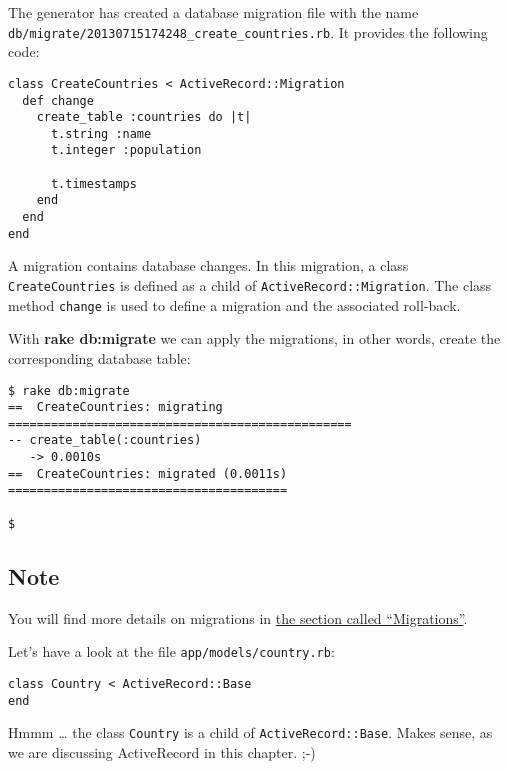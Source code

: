 \documentclass[a4paper]{book}
\newcounter{tab}[chapter]
\begin{document}
The generator has created a database migration file with the name \texttt{db/migrate/20130715174248\_create\_countries.rb}. It provides the following code:

\begin{shaded}\begin{verbatim}
class CreateCountries < ActiveRecord::Migration
  def change
    create_table :countries do |t|
      t.string :name
      t.integer :population

      t.timestamps
    end
  end
end
\end{verbatim}\end{shaded}

A migration contains database changes. In this migration, a class \texttt{CreateCountries} is defined as a child of \texttt{ActiveRecord::Migration}. The class method \texttt{change} is used to define a migration and the associated roll-back.

With \textbf{rake db:migrate} we can apply the migrations, in other words, create the corresponding database table:

\begin{shaded}\begin{verbatim}
$ rake db:migrate
==  CreateCountries: migrating ================================================
-- create_table(:countries)
   -> 0.0010s
==  CreateCountries: migrated (0.0011s) =======================================

$
\end{verbatim}\end{shaded}

\subsection{Note}\label{note-23}

You will find more details on migrations in \hyperref[activerecordux5fmigration]{the section called “Migrations”}.

Let's have a look at the file \texttt{app/models/country.rb}:

\begin{shaded}\begin{verbatim}
class Country < ActiveRecord::Base
end
\end{verbatim}\end{shaded}

Hmmm \ldots{} the class \texttt{Country} is a child of \texttt{ActiveRecord::Base}. Makes sense, as we are discussing ActiveRecord in this chapter. ;-)
\end{document}
